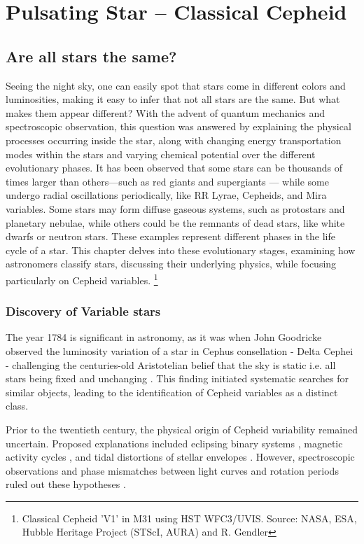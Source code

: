 \chapter{Pulsating Star -- Classical Cepheid}
\label{pulsating-star}




\section{Are all stars the same?}
Seeing the night sky, one can easily spot that stars come in different colors and luminosities, making it easy to infer that not all stars are the same. But what makes them appear different? With the advent of quantum mechanics and spectroscopic observation, this question was answered by explaining the physical processes occurring inside the star, along with changing energy transportation modes within the stars and varying chemical potential over the different evolutionary phases. It has been observed that some stars can be thousands of times larger than others—such as red giants and supergiants — while some undergo radial oscillations periodically, like RR Lyrae, Cepheids, and Mira variables. Some stars may form diffuse gaseous systems, such as protostars and planetary nebulae, while others could be the remnants of dead stars, like white dwarfs or neutron stars. These examples represent different phases in the life cycle of a star. This chapter delves into these evolutionary stages, examining how astronomers classify stars, discussing their underlying physics, while focusing particularly on Cepheid variables. \footnote{Classical Cepheid 'V1' in M31 using HST WFC3/UVIS. Source: NASA, ESA, Hubble Heritage Project (STScI, AURA) and R. Gendler }

\subsection{Discovery of Variable stars}
The year 1784 is significant in astronomy, as it was when John Goodricke observed the luminosity variation of a star in Cephus consellation - Delta Cephei - challenging the centuries-old Aristotelian belief that the sky is static i.e. all stars being fixed and unchanging \citep{1786john, 1785pigott}. This finding initiated systematic searches for similar objects, leading to the identification of Cepheid variables as a distinct class.

Prior to the twentieth century, the physical origin of Cepheid variability remained uncertain. Proposed explanations included eclipsing binary systems \citep{1899pickering,1903myers,1914shapley}, magnetic activity cycles \citep{1908hale,1914russellvariables}, and tidal distortions of stellar envelopes \citep{jeans1917tidal}. However, spectroscopic observations and phase mismatches between light curves and rotation periods ruled out these hypotheses \citep{1928struve, 1930wilson}.

